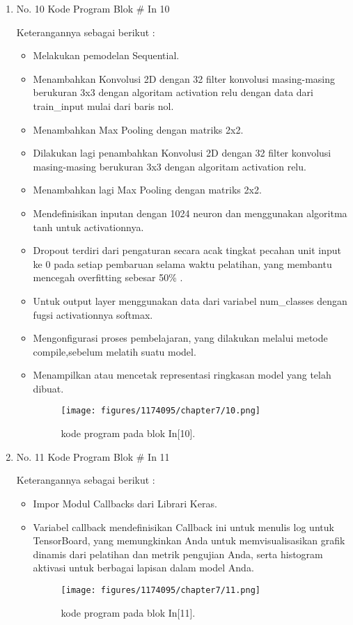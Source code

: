 \begin{enumerate}
\item No. 10 Kode Program Blok \# In 10
\par 
Keterangannya sebagai berikut :
\begin{itemize}
\item Melakukan pemodelan Sequential.
\item Menambahkan Konvolusi 2D dengan 32 filter konvolusi masing-masing berukuran 3x3 dengan algoritam activation relu dengan data dari train\_input mulai dari baris nol.
\item Menambahkan Max Pooling dengan matriks 2x2.
\item Dilakukan lagi penambahkan Konvolusi 2D dengan 32 filter konvolusi masing-masing berukuran 3x3 dengan algoritam activation relu.
\item Menambahkan lagi Max Pooling dengan matriks 2x2.
\item Mendefinisikan inputan dengan 1024 neuron dan menggunakan algoritma tanh untuk activationnya.
\item Dropout terdiri dari pengaturan secara acak tingkat pecahan unit input ke 0 pada setiap pembaruan selama waktu pelatihan, yang membantu mencegah overfitting sebesar 50\% .
\item Untuk output layer menggunakan data dari variabel num\_classes dengan fugsi activationnya softmax.
\item Mengonfigurasi proses pembelajaran, yang dilakukan melalui metode compile,sebelum melatih suatu model.
\item Menampilkan atau mencetak representasi ringkasan model yang telah dibuat.
\begin{figure}[H]
    \texttt{[image: figures/1174095/chapter7/10.png]}
    \centering
    \caption{kode program pada blok  In[10].}
    \end{figure}
\end{itemize}


\item No. 11 Kode Program Blok \# In 11
\par 
Keterangannya sebagai berikut :
\begin{itemize}
\item Impor Modul Callbacks dari Librari Keras.
\item Variabel callback mendefinisikan Callback ini untuk menulis log untuk TensorBoard, yang memungkinkan Anda untuk memvisualisasikan grafik dinamis dari pelatihan dan metrik pengujian Anda, serta histogram aktivasi untuk berbagai lapisan dalam model Anda.
\begin{figure}[H]
    \texttt{[image: figures/1174095/chapter7/11.png]}
    \centering
    \caption{kode program pada blok  In[11].}
    \end{figure}
\end{itemize}


\end{enumerate}
